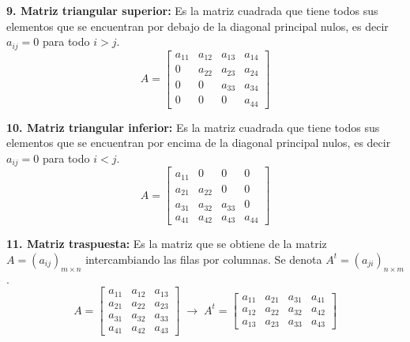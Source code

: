\documentclass[11pt,a4paper]{article}
\begin{document}
\medskip
\begin{minipage}[t]{0.485\textwidth}
\textbf{9. Matriz triangular superior:} Es la matriz cuadrada que tiene todos sus elementos
que se encuentran por debajo de la diagonal principal nulos, es decir $a_{ij} = 0$ para
todo $i > j$.
\[
A = \begin{bmatrix}
a_{11} & a_{12} & a_{13} & a_{14}\\
0 & a_{22} & a_{23} & a_{24}\\
0 & 0 & a_{33} & a_{34}\\
0 & 0 & 0 & a_{44}
\end{bmatrix}
\]
\end{minipage}\hfill
\begin{minipage}[t]{0.485\textwidth}
\textbf{10. Matriz triangular inferior:} Es la matriz cuadrada que tiene todos sus
elementos que se encuentran por encima de la diagonal principal nulos, es decir
$a_{ij} = 0$ para todo $i < j$.
\[
A = \begin{bmatrix}
a_{11} & 0 & 0 & 0\\
a_{21} & a_{22} & 0 & 0\\
a_{31} & a_{32} & a_{33} & 0\\
a_{41} & a_{42} & a_{43} & a_{44}
\end{bmatrix}
\]
\end{minipage}

\medskip
\textbf{11. Matriz traspuesta:} Es la matriz que se obtiene de la matriz
$A = (a_{ij})_{m\times n}$ intercambiando las filas por columnas. Se denota
$A^t = (a_{ji})_{n\times m}$.
\[
A = \begin{bmatrix}
a_{11} & a_{12} & a_{13}\\
a_{21} & a_{22} & a_{23}\\
a_{31} & a_{32} & a_{33}\\
a_{41} & a_{42} & a_{43}
\end{bmatrix}
\;\longrightarrow\;
A^t = \begin{bmatrix}
a_{11} & a_{21} & a_{31} & a_{41}\\
a_{12} & a_{22} & a_{32} & a_{42}\\
a_{13} & a_{23} & a_{33} & a_{43}
\end{bmatrix}
\]
\end{document}
